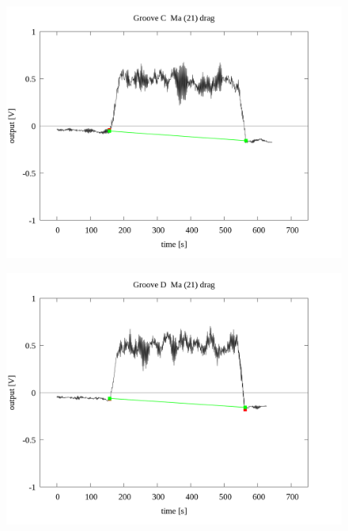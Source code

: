 \documentclass[a4paper]{jsarticle}
\begin{document}
\begin{figure}[htbp]
    \footnotesize
    \begin{center}
        \includegraphics[width=140mm]{../../../../33_result/210806/moving_average/21/drag/03/Groove_C_ma(21)_drag_03.png}
    \end{center}
\end{figure}

\begin{figure}[htbp]
    \footnotesize
    \begin{center}
        \includegraphics[width=140mm]{../../../../33_result/210806/moving_average/21/drag/03/Groove_D_ma(21)_drag_03.png}
    \end{center}
\end{figure}
\end{document}
